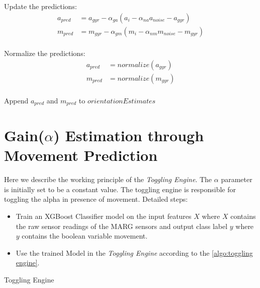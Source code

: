 \documentclass{iutbscthesis}
\begin{document}
\begin{algorithm}
{Update the predictions:
\begin{align*}
    a_{pred} &= a_{gyr} - \alpha_{ga}(a_i - \alpha_{na}a_{noise} - a_{gyr}) \\
    m_{pred} &= m_{gyr} - \alpha_{gm}(m_i - \alpha_{nm}m_{noise} - m_{gyr})
\end{align*}\\

Normalize  the predictions:
\begin{align*}
    a_{pred} &= normalize(a_{gyr}) \\
    m_{pred} &= normalize(m_{gyr})
\end{align*}\\
Append $a_{pred}$ and $m_{pred}$ to $orientationEstimates$\\
}
\end{algorithm}




\section{Gain($\alpha$) Estimation through Movement Prediction} \label{section:MovementPred}

Here we describe the working principle of the \textit{Toggling Engine}. The $\alpha$ parameter is initially set to be a constant value. The toggling engine is responsible for toggling the alpha in presence of movement. Detailed steps:
\begin{itemize}
    \item Train an XGBoost Classifier model\cite{chen2016xgboost} on the input features $X$ where $X$ contains the raw sensor readings of the MARG sensors and output class label $y$ where $y$ contains the boolean variable movement.
    \item Use the trained Model in the \textit{Toggling Engine} according to the \autoref{algo:toggling engine}.
\end{itemize}

\begin{algorithm}[H]
\SetAlgoLined
\DontPrintSemicolon
{}


\caption{Toggling Engine} \label{algo:toggling engine}
\end{algorithm}
\end{document}
